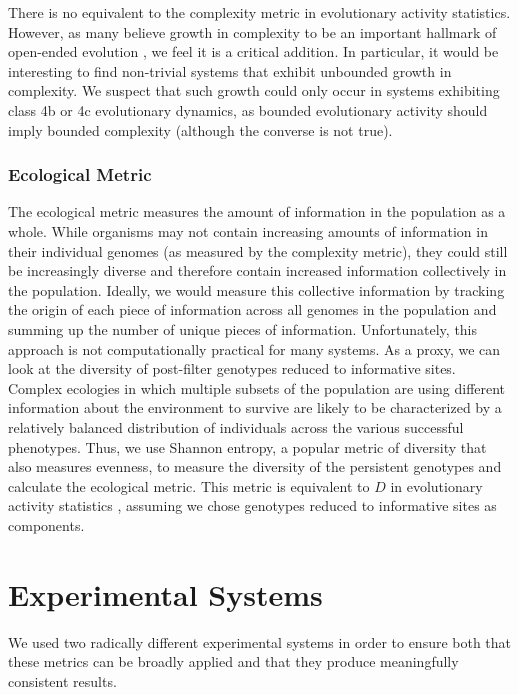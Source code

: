 \documentclass[letterpaper]{article}
\begin{document}
There is no equivalent to the complexity metric in evolutionary activity statistics. However, as many believe growth in complexity to be an important hallmark of open-ended evolution \citep{taylor_open-ended_2016}, we feel it is a critical addition. In particular, it would be interesting to find non-trivial systems that exhibit unbounded growth in complexity. We suspect that such growth could only occur in systems exhibiting class 4b or 4c evolutionary dynamics, as bounded evolutionary activity should imply bounded complexity (although the converse is not true).

\subsubsection{Ecological Metric}
The ecological metric measures the amount of information in the population as a whole. While organisms may not contain increasing amounts of information in their individual genomes (as measured by the complexity metric), they could still be increasingly diverse and therefore contain increased information collectively in the population. Ideally, we would measure this collective information by tracking the origin of each piece of information across all genomes in the population and summing up the number of unique pieces of information. Unfortunately, this approach is not computationally practical for many systems. As a proxy, we can look at the diversity of post-filter genotypes reduced to informative sites. Complex ecologies in which multiple subsets of the population are using different information about the environment to survive are likely to be characterized by a relatively balanced distribution of individuals across the various successful phenotypes. Thus, we use Shannon entropy, a popular metric of diversity that also measures evenness, to measure the diversity of the persistent genotypes and calculate the ecological metric. This metric is equivalent to $D$ in evolutionary activity statistics \citep{bedau_comparison_1997}, assuming we chose genotypes reduced to informative sites as components.

\section{Experimental Systems}

We used two radically different experimental systems in order to ensure both that these metrics can be broadly applied and that they produce meaningfully consistent results.
\end{document}
